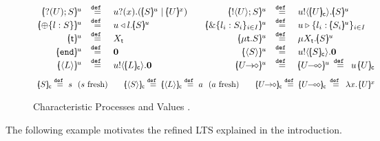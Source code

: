 \documentclass[a4paper,UKenglish]{lipics}
\theoremstyle{definition}
\begin{document}
\begin{figure}[t]
\[
	\begin{array}{rclcrcl}
		\mapchar{\btinp{U} S}{u}
		&\defeq&
		\binp{u}{x} (\mapchar{S}{u} \Par \mapchar{U}{x})
		&&
		\mapchar{\btout{U} S}{u}
		&\defeq&
		\bout{u}{\omapchar{U}} \mapchar{S}{u} %
		\\

		\mapchar{\btsel{l : S}}{u}
		& \defeq &
		\bsel{u}{l} \mapchar{S}{u}
		&&
		\mapchar{\btbra{l_i: S_i}_{i \in I}}{u}
		& \defeq &
		\bbra{u}{l_i: \mapchar{S_i}{u}}_{i \in I}
		\\

		\mapchar{\tvar{t}}{u}
		&\defeq&
		\varp{X}_{\vart{t}}
		& & 
		\mapchar{\trec{t}{S}}{u}
		&\defeq&
		\recp{X_{\vart{t}}}{\mapchar{S}{u}}
		\\

		\mapchar{\tinact}{u}
		& \defeq &
		\inact
		& & 
		\mapchar{\chtype{S}}{u} 
		&\defeq&
		\bout{u}{\omapchar{S}} \inact
		\\

		\mapchar{\chtype{L}}{u}
		&\defeq&
		\bout{u}{\omapchar{L}} \inact
		&&
		\mapchar{\shot{U}}{u}
		&\defeq &
		\mapchar{\lhot{U}}{u}
		\, \defeq \,
		\appl{u}{\omapchar{U}}
		\end{array}
		\]
		\vspace{-3mm}
		\[
		\begin{array}{c}
		\omapchar{S}  \defeq  s ~~ (s \textrm{ fresh})
		\qquad
		\omapchar{\chtype{S}} \defeq \omapchar{\chtype{L}} \defeq a ~~ (a \textrm{ fresh})
		\qquad
		\omapchar{\shot{U}} \defeq \omapchar{\lhot{U}} \,\defeq\, \abs{x}{\mapchar{U}{x}}
	\end{array}
\]
\vspace{-5mm}
\caption{Characteristic Processes  and Values .\label{fig:char}}
\vspace{-3mm}
\end{figure}





The following example motivates the refined 
LTS explained in %
the introduction.


 
\end{document}
